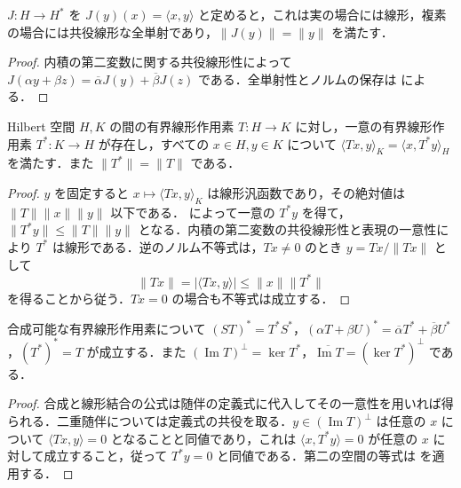 \begin{prop}[Hilbert空間とその双対の等長対応]
$J:H\to H^*$ を $J(y)(x)=\langle x,y\rangle$ と定めると，これは実の場合には線形，複素の場合には共役線形な全単射であり，$\|J(y)\|=\|y\|$ を満たす．
\end{prop}
\begin{proof}
内積の第二変数に関する共役線形性によって $J(\alpha y+\beta z)=\overline\alpha J(y)+\overline\beta J(z)$ である．全単射性とノルムの保存は  による．
\end{proof}
\begin{prop}[随伴作用素の存在と一意性]
Hilbert 空間 $H,K$ の間の有界線形作用素 $T:H\to K$ に対し，一意の有界線形作用素 $T^*:K\to H$ が存在し，すべての $x\in H,y\in K$ について $\langle Tx,y\rangle_K=\langle x,T^*y\rangle_H$ を満たす．また $\|T^*\|=\|T\|$ である．
\end{prop}
\begin{proof}
$y$ を固定すると $x\mapsto\langle Tx,y\rangle_K$ は線形汎函数であり，その絶対値は $\|T\|\|x\|\|y\|$ 以下である． によって一意の $T^*y$ を得て，$\|T^*y\|\leq\|T\|\|y\|$ となる．内積の第二変数の共役線形性と表現の一意性により $T^*$ は線形である．逆のノルム不等式は，$Tx\ne0$ のとき $y=Tx/\|Tx\|$ として
\[
\|Tx\|=|\langle Tx,y\rangle|\leq\|x\|\|T^*\|
\]
を得ることから従う．$Tx=0$ の場合も不等式は成立する．
\end{proof}
\begin{prop}[随伴の演算法則と直交性]
合成可能な有界線形作用素について $(ST)^*=T^*S^*$，$(\alpha T+\beta U)^*=\overline\alpha T^*+\overline\beta U^*$，$(T^*)^*=T$ が成立する．また $(\operatorname{Im}T)^\perp=\ker T^*$，$\overline{\operatorname{Im}T}=(\ker T^*)^\perp$ である．
\end{prop}
\begin{proof}
合成と線形結合の公式は随伴の定義式に代入してその一意性を用いれば得られる．二重随伴については定義式の共役を取る．$y\in(\operatorname{Im}T)^\perp$ は任意の $x$ について $\langle Tx,y\rangle=0$ となることと同値であり，これは $\langle x,T^*y\rangle=0$ が任意の $x$ に対して成立すること，従って $T^*y=0$ と同値である．第二の空間の等式は  を適用する．
\end{proof}
